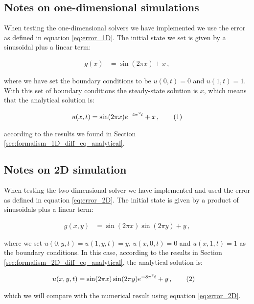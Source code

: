 \documentclass[reprint,english,notitlepage]{revtex4-1}  %
\newcommand\numberthis{\addtocounter{equation}{1}\tag{\theequation}}
\begin{document}
\subsection{Notes on one-dimensional simulations} \label{sec:method_1D_sims}

When testing the one-dimensional solvers we have implemented we use the error as defined in equation \eqref{eq:error_1D}. The initial state we set is given by a sinusoidal plus a linear term:

\begin{align*}
g(x) &= \sin ( 2\pi x) + x \, ,
\end{align*}

where we have set the boundary conditions to be $u(0,t) = 0$ and $u(1,t) = 1$. With this set of boundary conditions the steady-state solution is $x$, which means that the analytical solution is:

\begin{align*}
u(x,t) = \sin(2\pi x)e^{-4\pi^2 t} + x \, , \numberthis \label{eq:analytical_1D}
\end{align*} 

according to the results we found in Section \ref{sec:formalism_1D_diff_eq_analytical}.


\subsection{Notes on 2D simulation} \label{sec:method_2D_sim}

When testing the two-dimensional solver we have implemented and used the error as defined in equation \eqref{eq:error_2D}. The initial state is given by a product of sinusoidals plus a linear term:

\begin{align*}
g(x,y) &= \sin(2\pi x) \sin (2\pi y) + y \, ,
\end{align*}

where we set $u(0,y,t) = u(1,y,t) = y$, $u(x,0,t) = 0$ and $u(x,1,t) = 1$ as the boundary conditions. In this case, according to the results in Section \ref{sec:formalism_2D_diff_eq_analytical}, the analytical solution is:

\begin{align*}
u(x,y,t) &= \sin(2\pi x) \sin(2\pi y) e^{-8\pi^2 t} + y \, , \numberthis \label{eq:analytical_2D}
\end{align*}

which we will compare with the numerical result using equation \eqref{eq:error_2D}.
\end{document}
